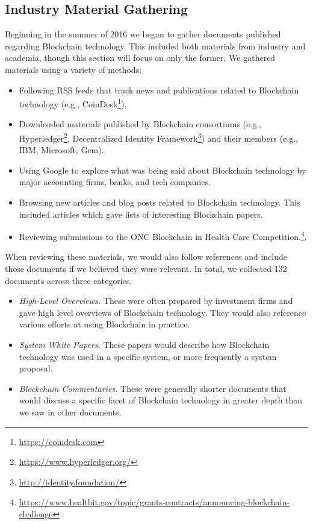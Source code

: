 \subsection{Industry Material Gathering}
Beginning in the summer of 2016 we began to gather documents published regarding Blockchain technology.
This included both materials from industry and academia, though this section will focus on only the former.
We gathered materials using a variety of methods:

\begin{itemize}
	\item Following RSS feeds that track news and publications related to Blockchain technology (e.g., CoinDesk\footnote{\url{https://coindesk.com}}).
	\item Downloaded materials published by Blockchain consortiums (e.g., Hyperledger\footnote{\url{https://www.hyperledger.org/}}, Decentralized Identity Framework\footnote{\url{http://identity.foundation/}}) and their members (e.g., IBM, Microsoft, Gem).
	\item Using Google to explore what was being said about Blockchain technology by major accounting firms, banks, and tech companies.
	\item Browsing new articles and blog posts related to Blockchain technology. This included articles which gave lists of interesting Blockchain papers.
	\item Reviewing submissions to the ONC Blockchain in Health Care Competition.\footnote{\url{https://www.healthit.gov/topic/grants-contracts/announcing-blockchain-challenge}}.
\end{itemize}

When reviewing these materials, we would also follow references and include those documents if we believed they were relevant.
In total, we collected 132 documents across three categories.

\begin{itemize}
	\item \emph{High-Level Overviews.} These were often prepared by investment firms and gave high level overviews of Blockchain technology. They would also reference various efforts at using Blockchain in practice.
	\item \emph{System White Papers.} These papers would describe how Blockchain technology was used in a specific system, or more frequently a system proposal.
	\item \emph{Blockchain Commentaries.} These were generally shorter documents that would discuss a specific facet of Blockchain technology in greater depth than we saw in other documents.
\end{itemize}

